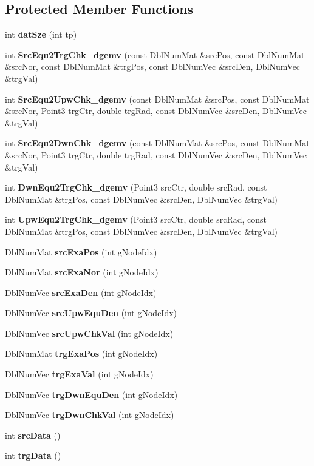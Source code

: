 \subsection*{Protected Member Functions}
\begin{CompactItemize}
\item 
int {\bf dat\-Sze} (int tp)
\item 
int {\bf Src\-Equ2Trg\-Chk\_\-dgemv} (const Dbl\-Num\-Mat \&src\-Pos, const Dbl\-Num\-Mat \&src\-Nor, const Dbl\-Num\-Mat \&trg\-Pos, const Dbl\-Num\-Vec \&src\-Den, Dbl\-Num\-Vec \&trg\-Val)
\item 
int {\bf Src\-Equ2Upw\-Chk\_\-dgemv} (const Dbl\-Num\-Mat \&src\-Pos, const Dbl\-Num\-Mat \&src\-Nor, Point3 trg\-Ctr, double trg\-Rad, const Dbl\-Num\-Vec \&src\-Den, Dbl\-Num\-Vec \&trg\-Val)
\item 
int {\bf Src\-Equ2Dwn\-Chk\_\-dgemv} (const Dbl\-Num\-Mat \&src\-Pos, const Dbl\-Num\-Mat \&src\-Nor, Point3 trg\-Ctr, double trg\-Rad, const Dbl\-Num\-Vec \&src\-Den, Dbl\-Num\-Vec \&trg\-Val)
\item 
int {\bf Dwn\-Equ2Trg\-Chk\_\-dgemv} (Point3 src\-Ctr, double src\-Rad, const Dbl\-Num\-Mat \&trg\-Pos, const Dbl\-Num\-Vec \&src\-Den, Dbl\-Num\-Vec \&trg\-Val)
\item 
int {\bf Upw\-Equ2Trg\-Chk\_\-dgemv} (Point3 src\-Ctr, double src\-Rad, const Dbl\-Num\-Mat \&trg\-Pos, const Dbl\-Num\-Vec \&src\-Den, Dbl\-Num\-Vec \&trg\-Val)
\item 
Dbl\-Num\-Mat {\bf src\-Exa\-Pos} (int g\-Node\-Idx)
\item 
Dbl\-Num\-Mat {\bf src\-Exa\-Nor} (int g\-Node\-Idx)
\item 
Dbl\-Num\-Vec {\bf src\-Exa\-Den} (int g\-Node\-Idx)
\item 
Dbl\-Num\-Vec {\bf src\-Upw\-Equ\-Den} (int g\-Node\-Idx)
\item 
Dbl\-Num\-Vec {\bf src\-Upw\-Chk\-Val} (int g\-Node\-Idx)
\item 
Dbl\-Num\-Mat {\bf trg\-Exa\-Pos} (int g\-Node\-Idx)
\item 
Dbl\-Num\-Vec {\bf trg\-Exa\-Val} (int g\-Node\-Idx)
\item 
Dbl\-Num\-Vec {\bf trg\-Dwn\-Equ\-Den} (int g\-Node\-Idx)
\item 
Dbl\-Num\-Vec {\bf trg\-Dwn\-Chk\-Val} (int g\-Node\-Idx)
\item 
int {\bf src\-Data} ()
\item 
int {\bf trg\-Data} ()
\end{CompactItemize}
